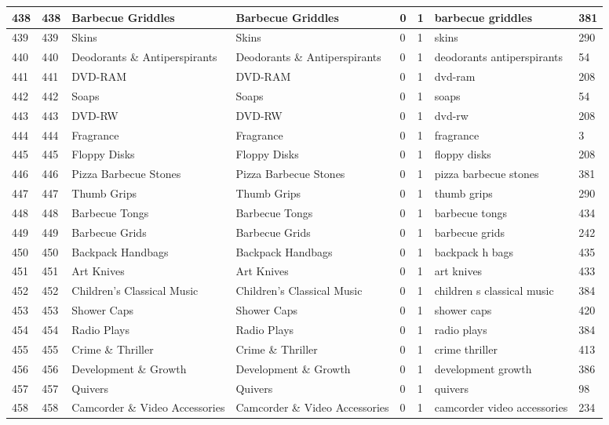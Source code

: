 \begin{longtable}{|l|l|l|l|l|l|l|l|}
438 & 438 & Barbecue Griddles & Barbecue Griddles & 0 & 1 & barbecue griddles & 381 \\ \hline 
439 & 439 & Skins & Skins & 0 & 1 & skins & 290 \\ \hline 
440 & 440 & Deodorants \& Antiperspirants & Deodorants \& Antiperspirants & 0 & 1 & deodorants antiperspirants & 54 \\ \hline 
441 & 441 & DVD-RAM & DVD-RAM & 0 & 1 & dvd-ram & 208 \\ \hline 
442 & 442 & Soaps & Soaps & 0 & 1 & soaps & 54 \\ \hline 
443 & 443 & DVD-RW & DVD-RW & 0 & 1 & dvd-rw & 208 \\ \hline 
444 & 444 & Fragrance & Fragrance & 0 & 1 & fragrance & 3 \\ \hline 
445 & 445 & Floppy Disks & Floppy Disks & 0 & 1 & floppy disks & 208 \\ \hline 
446 & 446 & Pizza Barbecue Stones & Pizza Barbecue Stones & 0 & 1 & pizza barbecue stones & 381 \\ \hline 
447 & 447 & Thumb Grips & Thumb Grips & 0 & 1 & thumb grips & 290 \\ \hline 
448 & 448 & Barbecue Tongs & Barbecue Tongs & 0 & 1 & barbecue tongs & 434 \\ \hline 
449 & 449 & Barbecue Grids & Barbecue Grids & 0 & 1 & barbecue grids & 242 \\ \hline 
450 & 450 & Backpack Handbags & Backpack Handbags & 0 & 1 & backpack h bags & 435 \\ \hline 
451 & 451 & Art Knives & Art Knives & 0 & 1 & art knives & 433 \\ \hline 
452 & 452 & Children's Classical Music & Children's Classical Music & 0 & 1 & children s classical music & 384 \\ \hline 
453 & 453 & Shower Caps & Shower Caps & 0 & 1 & shower caps & 420 \\ \hline 
454 & 454 & Radio Plays & Radio Plays & 0 & 1 & radio plays & 384 \\ \hline 
455 & 455 & Crime \& Thriller & Crime \& Thriller & 0 & 1 & crime thriller & 413 \\ \hline 
456 & 456 & Development \& Growth & Development \& Growth & 0 & 1 & development growth & 386 \\ \hline 
457 & 457 & Quivers & Quivers & 0 & 1 & quivers & 98 \\ \hline 
458 & 458 & Camcorder \& Video Accessories & Camcorder \& Video Accessories & 0 & 1 & camcorder video accessories & 234 \\ \hline 

\end{longtable}
